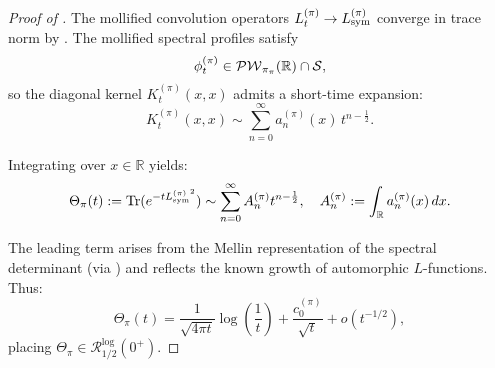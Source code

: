 \begin{proof}[Proof of ]
The mollified convolution operators \( L_t^{(\pi)} \to {L_{\mathrm{sym}}^{(\pi)}} \) converge in trace norm by . The mollified spectral profiles satisfy
\[
\phi_t^{(\pi)} \in \mathcal{PW}_{\pi_\pi}(\mathbb{R}) \cap \mathcal{S},
\]
so the diagonal kernel \( K_t^{(\pi)}(x, x) \) admits a short-time expansion:
\[
K_t^{(\pi)}(x, x) \sim \sum_{n=0}^\infty a_n^{(\pi)}(x) \, t^{n - \frac{1}{2}}.
\]

Integrating over \( x \in \mathbb{R} \) yields:
\[
\Theta_\pi(t) := \operatorname{Tr}(e^{-t {L_{\mathrm{sym}}^{(\pi)}}^2})
\sim \sum_{n=0}^\infty A_n^{(\pi)} t^{n - \frac{1}{2}},
\quad A_n^{(\pi)} := \int_{\mathbb{R}} a_n^{(\pi)}(x) \, dx.
\]

The leading term arises from the Mellin representation of the spectral determinant (via ) and reflects the known growth of automorphic \( L \)-functions. Thus:
\[
\Theta_\pi(t) = \frac{1}{\sqrt{4\pi t}} \log\left( \frac{1}{t} \right)
+ \frac{c_0^{(\pi)}}{\sqrt{t}} + o(t^{-1/2}),
\]
placing \( \Theta_\pi \in \mathcal{R}_{1/2}^{\log}(0^+) \).
\end{proof}
